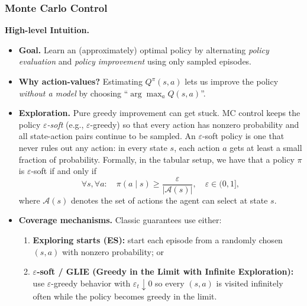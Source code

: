 \documentclass[
]{book}
\providecommand{\tightlist}{%
  \setlength{\itemsep}{0pt}\setlength{\parskip}{0pt}}
\theoremstyle{definition}
\theoremstyle{definition}
\theoremstyle{definition}
\theoremstyle{definition}
\theoremstyle{remark}
\begin{document}
\subsubsection{Monte Carlo Control}\label{monte-carlo-control}

\textbf{High-level Intuition.}

\begin{itemize}
\item
  \textbf{Goal.} Learn an (approximately) optimal policy by alternating \emph{policy evaluation} and \emph{policy improvement} using only sampled episodes.
\item
  \textbf{Why action-values?} Estimating \(Q^\pi(s,a)\) lets us improve the policy \emph{without a model} by choosing ``\(\arg\max_a Q(s,a)\)''.
\item
  \textbf{Exploration.} Pure greedy improvement can get stuck. MC control keeps the policy \emph{\(\varepsilon\)-soft} (e.g., \(\varepsilon\)-greedy) so that every action has nonzero probability and all state-action pairs continue to be sampled. An \(\varepsilon\)-soft policy is one that never rules out any action: in every state \(s\), each action \(a\) gets at least a small fraction of probability. Formally, in the tabular setup, we have that a policy \(\pi\) is \(\varepsilon\)-soft if and only if
  \begin{equation}
  \forall s, \forall a: \quad \pi(a \mid s) \geq \frac{\varepsilon}{|\mathcal{A}(s)|}, \quad \varepsilon \in (0,1],
  \label{eq:epsilon-soft-policy}
  \end{equation}
  where \(\mathcal{A}(s)\) denotes the set of actions the agent can select at state \(s\).
\item
  \textbf{Coverage mechanisms.} Classic guarantees use either:

  \begin{enumerate}
  \def\labelenumi{\arabic{enumi})}
  \tightlist
  \item
    \textbf{Exploring starts (ES):} start each episode from a randomly chosen \((s,a)\) with nonzero probability; or\\
  \item
    \textbf{\(\varepsilon\)-soft / GLIE (Greedy in the Limit with Infinite Exploration):} use \(\varepsilon\)-greedy behavior with \(\varepsilon_t \downarrow 0\) so every \((s,a)\) is visited infinitely often while the policy becomes greedy in the limit.
  \end{enumerate}
\end{itemize}
\end{document}
